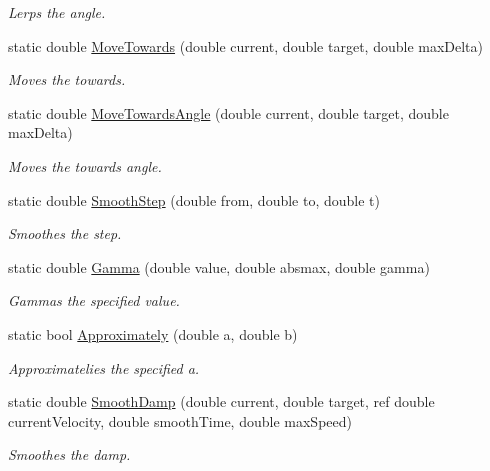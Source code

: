 \begin{DoxyCompactItemize}
\begin{DoxyCompactList}\small\item\em Lerps the angle. \end{DoxyCompactList}\item 
static double \hyperlink{struct_unity_engine_1_1_mathd_a300f1fdffcc78b5864dd97631218d4e4}{Move\+Towards} (double current, double target, double max\+Delta)
\begin{DoxyCompactList}\small\item\em Moves the towards. \end{DoxyCompactList}\item 
static double \hyperlink{struct_unity_engine_1_1_mathd_a7a649aabd32067ec9242869ee140e0b3}{Move\+Towards\+Angle} (double current, double target, double max\+Delta)
\begin{DoxyCompactList}\small\item\em Moves the towards angle. \end{DoxyCompactList}\item 
static double \hyperlink{struct_unity_engine_1_1_mathd_a41a5eb188904de993353a502dff5f671}{Smooth\+Step} (double from, double to, double t)
\begin{DoxyCompactList}\small\item\em Smoothes the step. \end{DoxyCompactList}\item 
static double \hyperlink{struct_unity_engine_1_1_mathd_af85b55be5457184d92d707f274ff93c2}{Gamma} (double value, double absmax, double gamma)
\begin{DoxyCompactList}\small\item\em Gammas the specified value. \end{DoxyCompactList}\item 
static bool \hyperlink{struct_unity_engine_1_1_mathd_a92aed1efcb52271af008e51bf69ce729}{Approximately} (double a, double b)
\begin{DoxyCompactList}\small\item\em Approximatelies the specified a. \end{DoxyCompactList}\item 
static double \hyperlink{struct_unity_engine_1_1_mathd_a85638a05cd967a88304f00d7a45d96f9}{Smooth\+Damp} (double current, double target, ref double current\+Velocity, double smooth\+Time, double max\+Speed)
\begin{DoxyCompactList}\small\item\em Smoothes the damp. \end{DoxyCompactList}\item 

\end{DoxyCompactItemize}
